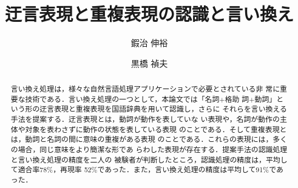 \documentclass{nlp}
\begin{document}
\setcounter{page}{81}
\setcounter{Volume}{11}
\setcounter{Number}{1}
\setcounter{Year}{2004} 
\setcounter{Month}{1}



\def\tr#1#2{}

	    



\setcounter{exctr}{0}


\newlength{\mywidth}

\def\exnum{}

\def\EXNUM{}

\def\exnumwidth{}

\def\ALPH{}

\def\myconfigure{}

\def\myleftmargin{}

\newenvironment{example}{}{}
\newenvironment{EXAMPLE}{}{}

\def\exlabel#1{}
\def\exref#1{}

\def\EXlabel#1{}

\def\EXref#1{}



\title{迂言表現と重複表現の認識と言い換え}
\author{鍜治 伸裕 \and 黒橋 禎夫}




\begin{abstract}
 言い換え処理は，様々な自然言語処理アプリケーションで必要とされている非
 常に重要な技術である．言い換え処理の一つとして，本論文では「名詞$+$格助
 詞$+$動詞」という形の迂言表現と重複表現を国語辞典を用いて認識し，さらに
 それらを言い換える手法を提案する．迂言表現とは，動詞が動作を表していな
 い表現や，名詞が動作の主体や対象を表わさずに動作の状態を表している表現
 のことである．そして重複表現とは，動詞と名詞の間に意味の重複がある表現
 のことである．これらの表現には，多くの場合，同じ意味をより簡潔な形であ
 らわした表現が存在する．提案手法の認識処理と言い換え処理の精度を二人の
 被験者が判断したところ，認識処理の精度は，平均して適合率78\%，再現率
 52\%であった．また，言い換え処理の精度は平均して91\%であった．
\end{abstract}
\end{document}
